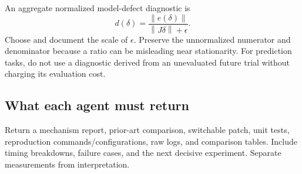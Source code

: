 \documentclass[11pt,a4paper]{article}
\newcommand{\norm}[1]{\left\lVert #1\right\rVert}
\begin{document}
An aggregate normalized model-defect diagnostic is
\begin{equation}
 d(\delta)=\frac{\norm{e(\delta)}}{\norm{J\delta}+\epsilon}.
\end{equation}
Choose and document the scale of $\epsilon$. Preserve the unnormalized numerator and denominator because a ratio can be misleading near stationarity. For prediction tasks, do not use a diagnostic derived from an unevaluated future trial without charging its evaluation cost.

\subsection*{What each agent must return}
Return a mechanism report, prior-art comparison, switchable patch, unit tests, reproduction commands/configurations, raw logs, and comparison tables. Include timing breakdowns, failure cases, and the next decisive experiment. Separate measurements from interpretation.
\end{document}

